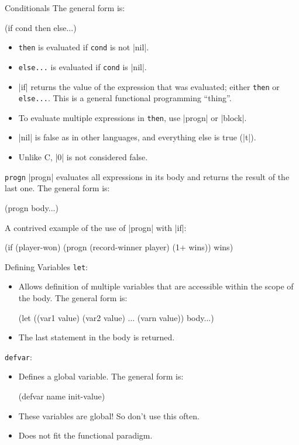 \documentclass{beamer}
\begin{document}
\begin{frame}[fragile]{Conditionals}
  The general form is:
  \begin{clcode}
    (if cond then else...)
  \end{clcode}
  \begin{itemize}
  \item \texttt{then} is evaluated if \texttt{cond} is not \cl|nil|.
  \item \texttt{else...} is evaluated if \texttt{cond} is \cl|nil|.
  \item \cl|if| returns the value of the expression that was evaluated; either \texttt{then} or \texttt{else...}. This is a general functional programming ``thing''.
  \item To evaluate multiple expressions in \texttt{then}, use \cl|progn| or \cl|block|.
  \item \cl|nil| is false as in other languages, and everything else is true (\cl|t|).
  \item Unlike C, \cl|0| is not considered false.
  \end{itemize}
\end{frame}

\begin{frame}[fragile]{\texttt{progn}}
  \cl|progn| evaluates all expressions in its body and returns the result of the last one. The general form is:
  \begin{clcode}
    (progn body...)
  \end{clcode}
A contrived example of the use of \cl|progn| with \cl|if|:
\begin{clcode}
(if (player-won)
  (progn
    (record-winner player)
    (1+ wins))
  wins)
\end{clcode}
\end{frame}

\begin{frame}[fragile]{Defining Variables}
\texttt{let}:
\begin{itemize}
\item Allows definition of multiple variables that are accessible
  within the scope of the body. The general form is:
\begin{clcode}
(let ((var1 value) (var2 value) ... (varn value)) body...)
\end{clcode}
\item The last statement in the body is returned.
\end{itemize}
\texttt{defvar}:
\begin{itemize}
\item Defines a global variable. The general form is:
  \begin{clcode}
    (defvar name init-value)
  \end{clcode}
\item These variables are global! So don't use this often.
\item Does not fit the functional paradigm.
\end{itemize}
\end{frame}
\end{document}
